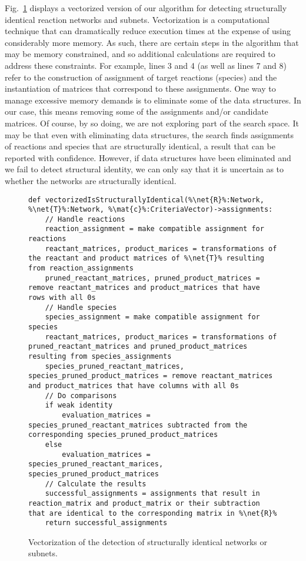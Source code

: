 \documentclass{article}
\newcommand{\mat}[1]{${\bf #1}$} %
\newcommand{\net}[1]{$\mathcal{#1}$} %
\newcommand{\fig}[1]{Fig.~\ref{#1}}
\begin{document}
\fig{alg:vectorizedIsStructurallyIdentical} displays a vectorized version of our algorithm for detecting structurally identical reaction networks and subnets. Vectorization is a computational technique that can dramatically reduce execution times at the expense of using considerably more memory. As such, there are certain steps in the algorithm that may be memory constrained, and so additional calculations are required to address these constraints. For example, lines 3 and 4 (as well as lines 7 and 8) refer to the construction of assignment of target reactions (species) and the instantiation of matrices that correspond to these assignments. One way to manage excessive memory demands is to eliminate some of the data structures. In our case, this means removing some of the assignments and/or candidate matrices. Of course, by so doing, we are not exploring part of the search space. It may be that even with eliminating data structures, the search finds assignments of reactions and species that are structurally identical, a result that can be reported with confidence. However, if data structures have been eliminated and we fail to detect structural identity, we can only say that it is uncertain as to whether the networks are structurally identical.

\begin{figure}
\begin{lstlisting}[mathescape=true,escapechar=\%]
def vectorizedIsStructurallyIdentical(%\net{R}%:Network, %\net{T}%:Network, %\mat{c}%:CriteriaVector)->assignments:
    // Handle reactions
    reaction_assignment = make compatible assignment for reactions
    reactant_matrices, product_marices = transformations of the reactant and product matrices of %\net{T}% resulting from reaction_assignments
    pruned_reactant_matrices, pruned_product_matrices = remove reactant_matrices and product_matrices that have rows with all 0s
    // Handle species
    species_assignment = make compatible assignment for species
    reactant_matrices, product_marices = transformations of pruned_reactant_matrices and pruned_product_matrices resulting from species_assignments
    species_pruned_reactant_matrices, species_pruned_product_matrices = remove reactant_matrices and product_matrices that have columns with all 0s
    // Do comparisons
    if weak identity
        evaluation_matrices = species_pruned_reactant_matrices subtracted from the corresponding species_pruned_product_matrices
    else
        evaluation_matrices = species_pruned_reactant_marices, species_pruned_product_matrices
    // Calculate the results
    successful_assignments = assignments that result in reaction_matrix and product_matrix or their subtraction that are identical to the corresponding matrix in %\net{R}%
    return successful_assignments        
\end{lstlisting}
\caption{Vectorization of the detection of structurally identical networks or subnets.}\label{alg:vectorizedIsStructurallyIdentical}
\end{figure}
\end{document}
